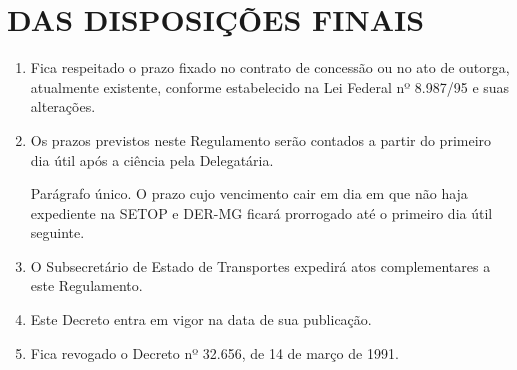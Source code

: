 \chapter{DAS DISPOSIÇÕES FINAIS}

\begin{enumerate}[resume, label=Art. \arabic*]

\item Fica respeitado o prazo fixado no contrato de concessão ou no ato de outorga, atualmente existente, conforme estabelecido na Lei Federal nº 8.987/95 e suas alterações.

\item Os prazos previstos neste Regulamento serão contados a partir do primeiro dia útil após a ciência pela Delegatária.

Parágrafo único. O prazo cujo vencimento cair em dia em que não haja expediente na SETOP e DER-MG ficará prorrogado até o primeiro dia útil seguinte.

\item O Subsecretário de Estado de Transportes expedirá atos complementares a este Regulamento.

\item Este Decreto entra em vigor na data de sua publicação.

\item Fica revogado o Decreto nº 32.656, de 14 de março de 1991.

\end{enumerate}